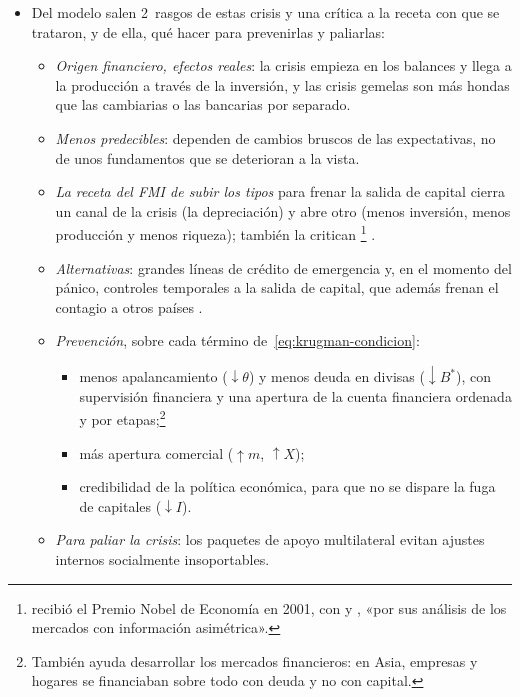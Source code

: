 \documentclass[11pt]{article}
\begin{document}
\begin{itemize}
\item Del modelo salen 2~rasgos de estas crisis y una crítica a la receta con que se trataron, y de ella, qué hacer para prevenirlas y paliarlas:
  \begin{itemize}
  \item \emph{Origen financiero, efectos reales}: la crisis empieza en los balances y llega a la producción a través de la inversión, y las crisis gemelas son más hondas que las cambiarias o las bancarias por separado.
  \item \emph{Menos predecibles}: dependen de cambios bruscos de las expectativas, no de unos fundamentos que se deterioran a la vista.
  \item \emph{La receta del FMI de subir los tipos} para frenar la salida de capital cierra un canal de la crisis (la depreciación) y abre otro (menos inversión, menos producción y menos riqueza)\nocite{Krugman1999Balance}; también la critican \textcite{FurmanStiglitz1998Economic}\footnote{ recibió el Premio Nobel de Economía en 2001, con  y , «por sus análisis de los mercados con información asimétrica»\nocite{Nobel2001AkerlofSpenceStiglitz}.} .
  \item \emph{Alternativas}: grandes líneas de crédito de emergencia y, en el momento del pánico, controles temporales a la salida de capital, que además frenan el contagio a otros países .
  \item \emph{Prevención}, sobre cada término de~\eqref{eq:krugman-condicion}:
    \begin{itemize}
    \item menos apalancamiento ($\downarrow\theta$) y menos deuda en divisas ($\downarrow B^{*}$), con supervisión financiera y una apertura de la cuenta financiera ordenada y por etapas;\footnote{También ayuda desarrollar los mercados financieros: en Asia, empresas y hogares se financiaban sobre todo con deuda y no con capital.}
    \item más apertura comercial ($\uparrow m$, $\uparrow X$);
    \item credibilidad de la política económica, para que no se dispare la fuga de capitales ($\downarrow I$).
    \end{itemize}
  \item \emph{Para paliar la crisis}: los paquetes de apoyo multilateral evitan ajustes internos socialmente insoportables.
  \end{itemize}
\end{itemize}
\end{document}
